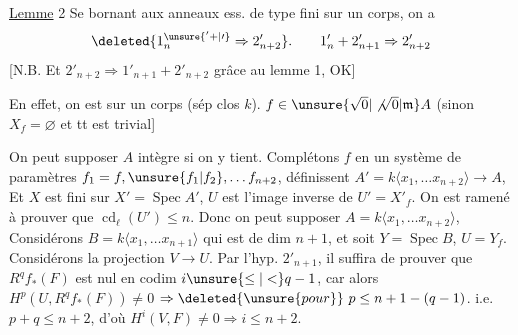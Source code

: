 \uline{Lemme} 2 Se bornant aux anneaux
ess. de type fini sur un corps, on a
\[
\deleted{1^{\unsure{'+|\prime}}_n\Rightarrow 2'_{n+2}}.\qquad 1'_n+2'_{n+1}\Rightarrow2'_{n+2}
\]
[N.B. Et $2'_{n+2}\Rightarrow1'_{n+1}+2'_{n+2}$ grâce au lemme 1, OK]

En effet, on est sur un corps (sép clos $k$).
 
$f\in\unsure{\sqrt{0}|\not\sqrt{0}|\mathfrak m}A$ (sinon $X_f=\varnothing$ et tt est trivial]

 On peut supposer $A$
intègre si on y tient. Complétons
$f$ en un système de paramètres
$f_1=f,\unsure{f_1|f_2},\ldots f_{n+2}$, 
 définissent 
$A'=k\langle x_1,\ldots x_{n+2}\rangle\to A$, Et $X$ 
est fini sur $X'=\operatorname{Spec} A'$, $U$ est l'image
inverse de $U'=X'_f$. On est
ramené à prouver que $\operatorname{cd}_{\ell}(U')\leq n$. Donc on
peut supposer $A=k\langle x_1,\ldots x_{n+2}\rangle$,  Considérons
$B=k\langle x_1,\ldots x_{n+1}\rangle$ qui est de dim $n+1$, et
soit $Y=\operatorname{Spec} B$, $U=Y_f$. Considérons la projection
$V\longrightarrow U$. Par l'hyp.  $2'_{n+1}$, il suffira de
prouver que  $R^qf_*(F)$ est nul en
codim $i\unsure{\leq|<}q-1$, car alors $H^p(U,R^qf_*(F))\ne0$
$\Rightarrow\deleted{\unsure{pour}}\ p\leq n+1-(q-1)$. i.e. $p+q\leq n+2$,
d'où $H^i(V,F)\ne0\Rightarrow i\leq n+2$.

